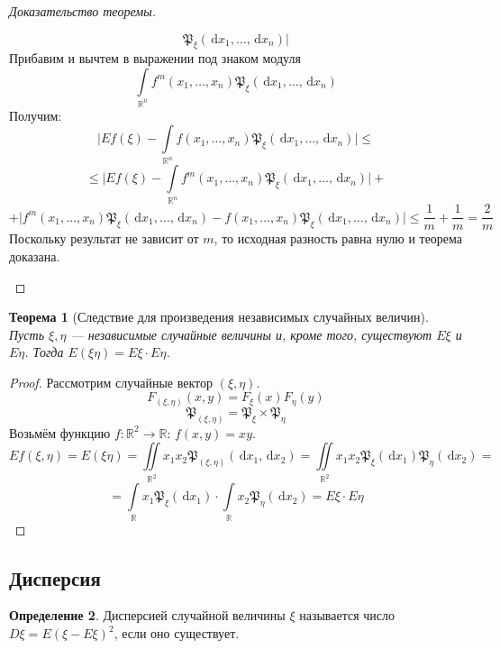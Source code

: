 \documentclass[11pt,openany,a4paper]{scrartcl}
\theoremstyle{plain}
\newtheorem{theorem}{Теорема}[subsection]
\theoremstyle{definition}
\newtheorem{definition}[theorem]{Определение}
\newcommand\mb{\mathbb}
\newcommand\real{\mb R}
\newcommand{\dif}{\, \mathrm d}
\begin{document}
\begin{proof}[Доказательство теоремы]
\begin{enumerate}
$$        \mathfrak P_\xi(\dif x_1, \ldots, \dif x_n)\big|
        $$
        Прибавим и вычтем в выражении под знаком модуля
        $$
        \int\limits_{\real^n} f^m(x_1, \ldots, x_n)
        \mathfrak P_\xi(\dif x_1, \ldots, \dif x_n)
        $$
        Получим:
        $$
        \big| Ef(\xi) - \int\limits_{\real^n} f(x_1, \ldots, x_n)
        \mathfrak P_\xi(\dif x_1, \ldots, \dif x_n)\big| \leqslant
        $$
        $$
        \leqslant\big| Ef(\xi) - \int\limits_{\real^n} f^m(x_1, \ldots, x_n)
        \mathfrak P_\xi(\dif x_1, \ldots, \dif x_n)\big| +
        $$
        $$
        +\big|f^m(x_1, \ldots, x_n)
        \mathfrak P_\xi(\dif x_1, \ldots, \dif x_n) -
        f(x_1, \ldots, x_n)
        \mathfrak P_\xi(\dif x_1, \ldots, \dif x_n)\big| \leqslant
        \frac{1}{m} + \frac{1}{m} = \frac{2}{m}
        $$
        Поскольку результат не зависит от $m$, то исходная разность равна нулю
        и теорема доказана.
    \end{enumerate}
\end{proof}

\begin{theorem}[Следствие для произведения независимых случайных величин]
    \label{expectation_for_independent_variables}
    Пусть $\xi, \eta$ — независимые случайные величины и, кроме того,
    существуют $E\xi$ и $E\eta$. Тогда $E(\xi\eta) = E\xi \cdot E\eta$.
\end{theorem}
\begin{proof}
    Рассмотрим случайные вектор $(\xi, \eta)$.
    $$
    F_{(\xi, \eta)}(x, y) = F_\xi(x)F_\eta(y)
    $$
    $$
    \mathfrak P_{(\xi, \eta)} = \mathfrak P_\xi \times \mathfrak P_\eta
    $$
    Возьмём функцию $f: \real^2 \to \real$: $f(x, y) = xy$.
    $$
    Ef(\xi, \eta) = E(\xi\eta) = \iint\limits_{\real^2} x_1x_2
    \mathfrak P_{(\xi, \eta)}(\dif x_1, \dif x_2) =
    \iint\limits_{\real^2} x_1x_2 \mathfrak P_\xi(\dif x_1)
    \mathfrak P_\eta(\dif x_2) =
    $$
    $$
    = \int\limits_{\real} x_1\mathfrak P_\xi(\dif x_1) \cdot
    \int\limits_{\real} x_2\mathfrak P_\eta(\dif x_2) =
    E\xi \cdot E\eta
    $$
\end{proof}

\subsection{Дисперсия}

\begin{definition}
    Дисперсией случайной величины $\xi$ называется число
    $D\xi = E(\xi - E\xi)^2$, если оно существует.
\end{definition}
\end{document}

